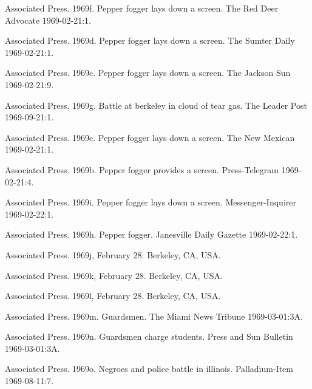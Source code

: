 \documentclass[
  11pt,
]{krantz}
\newlength{\cslhangindent}
\newlength{\cslentryspacingunit} %
\newenvironment{CSLReferences}[2] %
 {%
  \setlength{\parindent}{0pt}
  \ifodd #1
  \let\oldpar\par
  \def\par{\hangindent=\cslhangindent\oldpar}
  \fi
  \setlength{\parskip}{#2\cslentryspacingunit}
 }%
 {}
\begin{document}
\begin{CSLReferences}{1}{0}
\leavevmode{}%
Associated Press. 1969f. Pepper fogger lays down a screen. The Red Deer Advocate 1969-02-21:1.

\leavevmode{}%
Associated Press. 1969d. Pepper fogger lays down a screen. The Sumter Daily 1969-02-21:1.

\leavevmode{}%
Associated Press. 1969c. Pepper fogger lays down a screen. The Jackson Sun 1969-02-21:9.

\leavevmode{}%
Associated Press. 1969g. Battle at berkeley in cloud of tear gas. The Leader Post 1969-09-21:1.

\leavevmode{}%
Associated Press. 1969e. Pepper fogger lays down a screen. The New Mexican 1969-02-21:1.

\leavevmode{}%
Associated Press. 1969b. Pepper fogger provides a screen. Press-Telegram 1969-02-21:4.

\leavevmode{}%
Associated Press. 1969i. Pepper fogger lays down a screen. Messenger-Inquirer 1969-02-22:1.

\leavevmode{}%
Associated Press. 1969h. Pepper fogger. Janesville Daily Gazette 1969-02-22:1.

\leavevmode{}%
Associated Press. 1969j, February 28. Berkeley, CA, USA.

\leavevmode{}%
Associated Press. 1969k, February 28. Berkeley, CA, USA.

\leavevmode{}%
Associated Press. 1969l, February 28. Berkeley, CA, USA.

\leavevmode{}%
Associated Press. 1969m. Guardsmen. The Miami News Tribune 1969-03-01:3A.

\leavevmode{}%
Associated Press. 1969n. Guardsmen charge students. Press and Sun Bulletin 1969-03-01:3A.

\leavevmode{}%
Associated Press. 1969o. Negroes and police battle in illinois. Palladium-Item 1969-08-11:7.


\end{CSLReferences}
\end{document}
